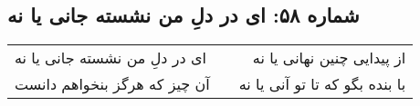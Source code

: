 \begin{center}
\section*{شماره ۵۸: ای در دلِ من نشسته جانی یا نه}
\label{sec:058}
\begin{longtable}{l p{0.5cm} r}
ای در دلِ من نشسته جانی یا نه
&&
از پیدایی چنین نهانی یا نه
\\
آن چیز که هرگز بنخواهم دانست
&&
با بنده بگو که تا تو آنی یا نه
\\
\end{longtable}
\end{center}
